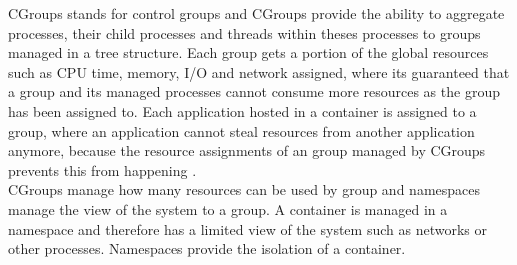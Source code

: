 CGroups stands for control groups and CGroups provide the ability to aggregate processes, their child processes and threads within theses processes to groups managed in a tree structure. Each group gets a portion of the global resources such as CPU time, memory, I/O and network assigned, where its guaranteed that a group and its managed processes cannot consume more resources as the group has been assigned to. Each application hosted in a container is assigned to a group, where an application cannot steal resources from another application anymore, because the resource assignments of an group managed by CGroups prevents this from happening \cite{KernelCGroupsV12018, KernelCGroupV22015, IntelLXCHyperVisor2014}. \\

CGroups manage how many resources can be used by group and namespaces manage the view of the system to a group. A container is managed in a namespace and therefore has a limited view of the system such as networks or other processes. Namespaces provide the isolation of a container.


